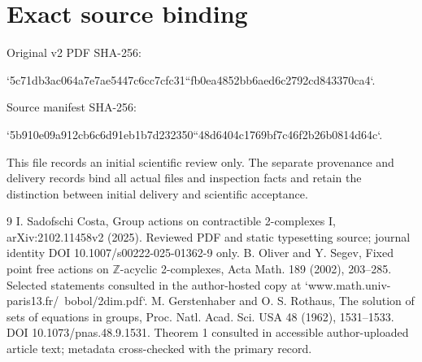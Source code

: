 \documentclass[10pt]{article}
\begin{document}
\section*{Exact source binding}
Original v2 PDF SHA-256:\par
`5c71db3ac064a7e7ae5447c6cc7cfc31``fb0ea4852bb6aed6c2792cd843370ca4`.\par
Source manifest SHA-256:\par
`5b910e09a912cb6c6d91eb1b7d232350``48d6404c1769bf7c46f2b26b0814d64c`.\par
This file records an initial scientific review only. The separate provenance and delivery records bind all actual files and inspection facts and retain the distinction between initial delivery and scientific acceptance.\par
9 I. Sadofschi Costa, Group actions on contractible 2-complexes I, arXiv:2102.11458v2 (2025). Reviewed PDF and static typesetting source; journal identity DOI 10.1007/s00222-025-01362-9 only. B. Oliver and Y. Segev, Fixed point free actions on \(\mathbb Z\)-acyclic 2-complexes, Acta Math. 189 (2002), 203–285. Selected statements consulted in the author-hosted copy at `www.math.univ-paris13.fr/ bobol/2dim.pdf`. M. Gerstenhaber and O. S. Rothaus, The solution of sets of equations in groups, Proc. Natl. Acad. Sci. USA 48 (1962), 1531–1533. DOI 10.1073/pnas.48.9.1531. Theorem 1 consulted in accessible author-uploaded article text; metadata cross-checked with the primary record.\par
\end{document}
